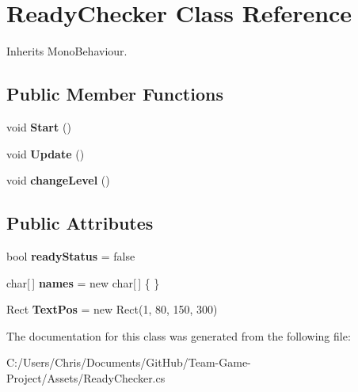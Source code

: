 \hypertarget{class_ready_checker}{}\section{Ready\+Checker Class Reference}
\label{class_ready_checker}


Inherits Mono\+Behaviour.

\subsection*{Public Member Functions}
\begin{DoxyCompactItemize}
\item 
void {\bfseries Start} ()\hypertarget{class_ready_checker_a27ca28b39dcb8c1ce877897697ce2b18}{}\label{class_ready_checker_a27ca28b39dcb8c1ce877897697ce2b18}

\item 
void {\bfseries Update} ()\hypertarget{class_ready_checker_a11648768e68fb12475d54e720bbddab6}{}\label{class_ready_checker_a11648768e68fb12475d54e720bbddab6}

\item 
void {\bfseries change\+Level} ()\hypertarget{class_ready_checker_abffed304ead7c2ce9762fe6e94904023}{}\label{class_ready_checker_abffed304ead7c2ce9762fe6e94904023}

\end{DoxyCompactItemize}
\subsection*{Public Attributes}
\begin{DoxyCompactItemize}
\item 
bool {\bfseries ready\+Status} = false\hypertarget{class_ready_checker_ad0014e4d0e9f56c96f7d4f2bb23f69e3}{}\label{class_ready_checker_ad0014e4d0e9f56c96f7d4f2bb23f69e3}

\item 
char\mbox{[}$\,$\mbox{]} {\bfseries names} = new char\mbox{[}$\,$\mbox{]} \{ \}\hypertarget{class_ready_checker_a97690441cc708d76022e3537eaa6184b}{}\label{class_ready_checker_a97690441cc708d76022e3537eaa6184b}

\item 
Rect {\bfseries Text\+Pos} = new Rect(1, 80, 150, 300)\hypertarget{class_ready_checker_afa679dd481f0d8a6783af3cc1eebfcc7}{}\label{class_ready_checker_afa679dd481f0d8a6783af3cc1eebfcc7}

\end{DoxyCompactItemize}


The documentation for this class was generated from the following file\+:\begin{DoxyCompactItemize}
\item 
C\+:/\+Users/\+Chris/\+Documents/\+Git\+Hub/\+Team-\/\+Game-\/\+Project/\+Assets/Ready\+Checker.\+cs\end{DoxyCompactItemize}
